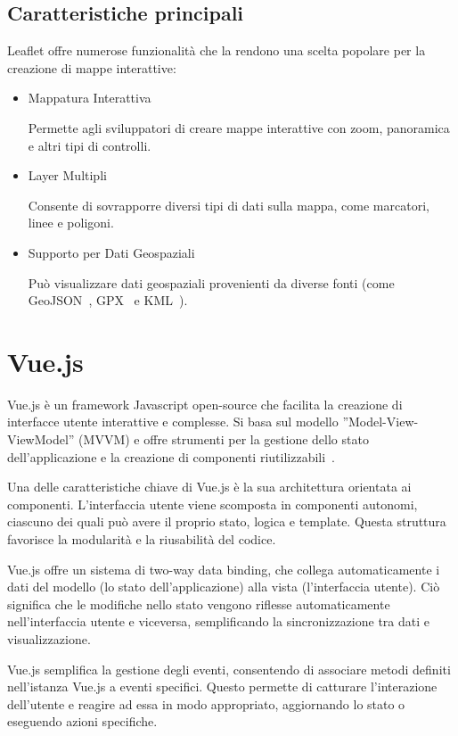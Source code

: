 \newpage

\subsection{Caratteristiche principali}
Leaflet offre numerose funzionalità che la rendono una scelta popolare per la creazione di mappe interattive:

\begin{itemize}
    \item Mappatura Interattiva
    
    Permette agli sviluppatori di creare mappe interattive con zoom, panoramica e altri tipi di controlli.

    \item Layer Multipli
    
    Consente di sovrapporre diversi tipi di dati sulla mappa, come marcatori, linee e poligoni.

    \item Supporto per Dati Geospaziali
    
    Può visualizzare dati geospaziali provenienti da diverse fonti (come GeoJSON~\cite{GeoJSON}, GPX~\cite{GPX} e KML~\cite{KML}).
    
\end{itemize}

\section{Vue.js}
Vue.js è un framework Javascript open-source che facilita la creazione di interfacce utente interattive e complesse. Si basa sul modello ”Model-View-ViewModel” (MVVM) e offre strumenti per la gestione dello stato dell'applicazione e la creazione di componenti riutilizzabili~\cite{Vue}.

Una delle caratteristiche chiave di Vue.js è la sua architettura orientata ai componenti. L'interfaccia utente viene scomposta in componenti autonomi, ciascuno dei quali può avere il proprio stato, logica e template. Questa struttura favorisce la modularità e la riusabilità del codice.

Vue.js offre un sistema di two-way data binding, che collega automaticamente i dati del modello (lo stato dell'applicazione) alla vista (l'interfaccia utente). Ciò significa che le modifiche nello stato vengono riflesse automaticamente nell'interfaccia utente e viceversa, semplificando la sincronizzazione tra dati e visualizzazione.

Vue.js semplifica la gestione degli eventi, consentendo di associare metodi definiti nell'istanza Vue.js a eventi specifici. Questo permette di catturare l'interazione dell'utente e reagire ad essa in modo appropriato, aggiornando lo stato o eseguendo azioni specifiche.

